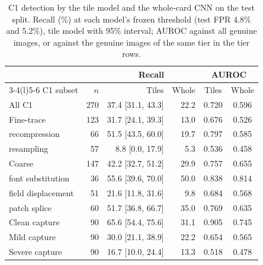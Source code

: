 \begin{table}[!t]
\caption{C1 detection by the tile model and the whole-card CNN on the test split. Recall (\%) at each model's frozen threshold (test FPR 4.8\% and 5.2\%), tile model with 95\% interval; AUROC against all genuine images, or against the genuine images of the same tier in the tier rows.}
\label{tab:rq1}
\centering
\scriptsize
\setlength{\tabcolsep}{2.6pt}
\renewcommand{\arraystretch}{1.06}
\begin{tabular}{@{}l r r r c c@{}}
\toprule
 & & \multicolumn{2}{c}{Recall} & \multicolumn{2}{c}{AUROC} \\ \cmidrule(lr){3-4}\cmidrule(l){5-6}
C1 subset & $n$ & Tiles & Whole & Tiles & Whole \\
\midrule
All C1 & 270 & 37.4 {\tiny[31.1, 43.3]} & 22.2 & 0.720 & 0.596 \\
Fine-trace & 123 & 31.7 {\tiny[24.1, 39.3]} & 13.0 & 0.676 & 0.526 \\
\quad recompression & 66 & 51.5 {\tiny[43.5, 60.0]} & 19.7 & 0.797 & 0.585 \\
\quad resampling & 57 & 8.8 {\tiny[0.0, 17.9]} & 5.3 & 0.536 & 0.458 \\
Coarse & 147 & 42.2 {\tiny[32.7, 51.2]} & 29.9 & 0.757 & 0.655 \\
\quad font substitution & 36 & 55.6 {\tiny[39.6, 70.0]} & 50.0 & 0.838 & 0.814 \\
\quad field displacement & 51 & 21.6 {\tiny[11.8, 31.6]} & 9.8 & 0.684 & 0.568 \\
\quad patch splice & 60 & 51.7 {\tiny[36.8, 66.7]} & 35.0 & 0.769 & 0.635 \\
\midrule
Clean capture & 90 & 65.6 {\tiny[54.4, 75.6]} & 31.1 & 0.905 & 0.745 \\
Mild capture & 90 & 30.0 {\tiny[21.1, 38.9]} & 22.2 & 0.654 & 0.565 \\
Severe capture & 90 & 16.7 {\tiny[10.0, 24.4]} & 13.3 & 0.518 & 0.478 \\
\bottomrule
\end{tabular}
\end{table}
